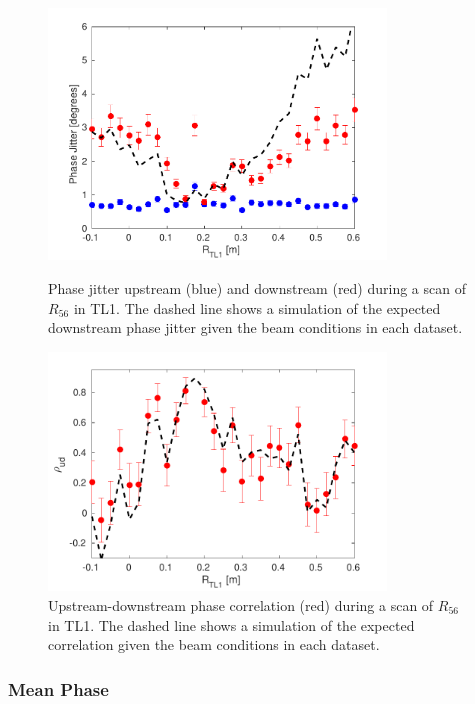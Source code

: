 \begin{figure}
  \centering
  \includegraphics[width=0.8\textwidth]{Figures/propagation/r56Scan_meanPhaseJit}
  \caption{Phase jitter upstream (blue) and downstream (red) during a scan of \(R_{56}\) in TL1. The dashed line shows a simulation of the expected downstream phase jitter given the beam conditions in each dataset.}
  \label{f:r56Scan_meanPhaseJit}

  \includegraphics[width=0.8\textwidth]{Figures/propagation/r56Scan_correlation}
  \caption{Upstream-downstream phase correlation (red) during a scan of \(R_{56}\) in TL1. The dashed line shows a simulation of the expected correlation given the beam conditions in each dataset.}
  \label{f:r56Scan_correlation}
\end{figure}


\subsubsection{Mean Phase}

